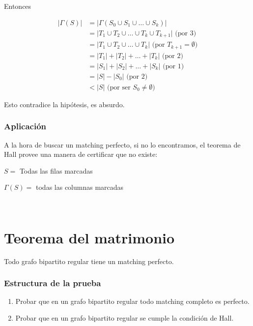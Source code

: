 \documentclass[10pt,a4paper]{article}
\begin{document}
Entonces

\begin{center}
\begin{align*} \lvert \Gamma(S)\rvert &= \lvert \Gamma(S_0 \cup S_1 \cup \dots \cup S_k)\rvert\\ &= \lvert T_1 \cup T_2 \cup \dots \cup T_k \cup T_{k+1}\rvert \text{ (por 3)}\\ &= \lvert T_1 \cup T_2 \cup \dots \cup T_k\rvert \text{ (por }T_{k+1} = \emptyset\text{)}\\ &= \lvert T_1\rvert + \lvert T_2\rvert + \dots + \lvert T_k\rvert \text{ (por 2) }\\ &= \lvert S_1\rvert + \lvert S_2\rvert + \dots + \lvert S_k\rvert \text{ (por 1)}\\ &= \lvert S \rvert - \lvert S_0 \rvert\text{ (por 2)}\\ &< \lvert S \rvert \text{ (por ser } S_0 \neq \emptyset \text{)} \end{align*}
\end{center}

Esto contradice la hipótesis, es absurdo.

\subsubsection*{Aplicación}

A la hora de buscar un matching perfecto, si no lo encontramos, el teorema de Hall provee una manera de certificar que no existe:

\begin{center}
$S = $ Todas las filas marcadas
\end{center}

\begin{center}
$\Gamma(S) = $ todas las columnas marcadas
\end{center}

 

\section*{Teorema del matrimonio}

Todo grafo bipartito regular tiene un matching perfecto.

\subsubsection*{Estructura de la prueba}

\begin{enumerate}

	\item Probar que en un grafo bipartito regular todo matching completo es perfecto.
	\item Probar que en un grafo bipartito regular se cumple la condición de Hall.
\end{enumerate}
\end{document}
